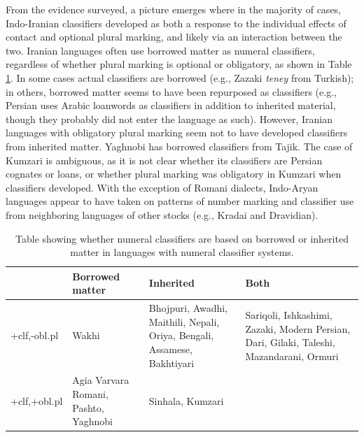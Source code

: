 \documentclass[11pt]{article}
\begin{document}
From the evidence surveyed, a picture emerges where in the majority of cases, Indo-Iranian classifiers developed as both a response 
to the individual effects of contact and optional plural marking, and likely via an interaction between the two. Iranian languages often use borrowed matter as numeral classifiers, regardless of whether plural marking is optional or obligatory, as shown in Table \ref{counts}. In some cases actual classifiers are borrowed (e.g., Zazaki {\it teney} from Turkish); in others, borrowed matter seems to have been repurposed as classifiers (e.g., Persian uses Arabic loanwords as classifiers in addition to inherited material, though they probably did not enter the language as such). 
However, Iranian languages with obligatory plural marking seem not to have developed classifiers from inherited matter. 
Yaghnobi has borrowed classifiers from Tajik. 
The case of Kumzari is ambiguous, as it is not clear whether its classifiers are Persian cognates or loans, or whether plural marking was obligatory in Kumzari when classifiers developed. 
With the exception of Romani dialects, Indo-Aryan languages appear to have taken on patterns of number marking and classifier use from neighboring languages of other stocks (e.g., Kradai and Dravidian). 
 
 
\begin{table}
{\small 
 \begin{tabular}{|p{.15\linewidth}||p{.25\linewidth}|p{.25\linewidth}|p{.25\linewidth}|}
 \hline
  & Borrowed matter & Inherited & Both \\
 \hline
 +clf,-obl.pl & Wakhi & Bhojpuri, Awadhi, Maithili, Nepali, Oriya, Bengali, Assamese, Bakhtiyari & Sariqoli, Ishkashimi, Zazaki, Modern Persian, Dari, Gilaki, Taleshi, Mazandarani, Ormuri \\
\hline
+clf,+obl.pl & Agia Varvara Romani, Pashto, Yaghnobi & Sinhala, Kumzari & \\
\hline
 \end{tabular}
 }
 \caption{Table showing whether numeral classifiers are based on borrowed or inherited matter in languages with numeral classifier systems.}
 \label{counts}
 \end{table}

\end{document}
